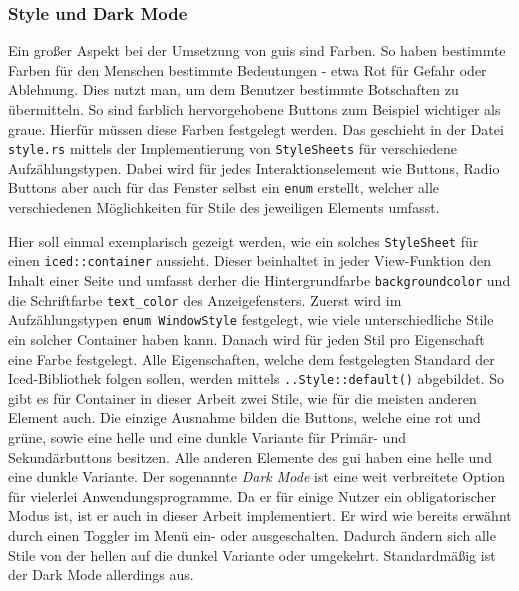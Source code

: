 \subsubsection{Style und Dark Mode}
Ein großer Aspekt bei der Umsetzung von \ac{gui}s sind Farben. So haben bestimmte Farben für den Menschen bestimmte Bedeutungen - etwa Rot für Gefahr oder Ablehnung.
Dies nutzt man, um dem Benutzer bestimmte Botschaften zu übermitteln. So sind farblich hervorgehobene Buttons zum Beispiel wichtiger als graue. Hierfür müssen diese Farben festgelegt werden.
Das geschieht in der Datei \lstinline{style.rs} mittels der Implementierung von \lstinline{StyleSheets} für verschiedene Aufzählungstypen.
Dabei wird für jedes Interaktionselement wie Buttons, Radio Buttons aber auch für das Fenster selbst ein \lstinline{enum} erstellt, welcher alle verschiedenen Möglichkeiten für Stile des jeweiligen Elements 
umfasst. 

Hier soll einmal exemplarisch gezeigt werden, wie ein solches \lstinline{StyleSheet} für einen \lstinline{iced::container} aussieht. Dieser beinhaltet in jeder View-Funktion den Inhalt einer Seite 
und umfasst derher die Hintergrundfarbe \lstinline{backgroundcolor} und die Schriftfarbe \lstinline{text_color} des Anzeigefensters. 
Zuerst wird im Aufzählungstypen \lstinline{enum WindowStyle} festgelegt, wie viele unterschiedliche Stile ein solcher Container haben kann. 
Danach wird für jeden Stil pro Eigenschaft eine Farbe festgelegt. Alle Eigenschaften, welche dem festgelegten Standard der Iced-Bibliothek folgen sollen, werden mittels 
\lstinline{..Style::default()} abgebildet. So gibt es für Container in dieser Arbeit zwei Stile, wie für die meisten anderen Element auch. Die einzige Ausnahme bilden die Buttons, welche eine rot und grüne, 
sowie eine helle und eine dunkle Variante für Primär- und Sekundärbuttons besitzen. 
Alle anderen Elemente des \ac{gui} haben eine helle und eine dunkle Variante. Der sogenannte \emph{Dark Mode} ist eine weit verbreitete Option für vielerlei Anwendungsprogramme. Da er für einige Nutzer ein obligatorischer Modus ist,
ist er auch in dieser Arbeit implementiert. Er wird wie bereits erwähnt durch einen Toggler im Menü ein- oder ausgeschalten. Dadurch ändern sich alle Stile von der hellen auf die dunkel Variante oder umgekehrt. 
Standardmäßig ist der Dark Mode allerdings aus.

